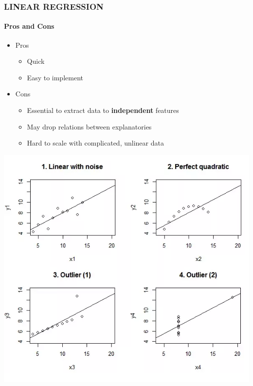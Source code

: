 \documentclass[11pt]{beamer}
\begin{document}
\begin{frame}
	\frametitle{\textbf{LINEAR REGRESSION}}
	\framesubtitle{Pros and Cons}
	\begin{minipage}[c]{0.5\textwidth}
	\begin{itemize}
		\item Pros
		\begin{itemize}
			\pause
			\item Quick
			\pause
			\item Easy to implement	
			\pause
		\end{itemize}
		\item Cons 
			\pause
		\begin{itemize}
			\item Essential to extract data to \textbf{independent} features
			\pause
			\item May drop relations between explanatories
			\pause
			\item Hard to scale with complicated, unlinear data
		\end{itemize}
	\end{itemize}
	\end{minipage}
	\begin{minipage}[c]{0.4\textwidth}
	\begin{center}
		\includegraphics[width=\textwidth]{unLR.png}	
	\end{center}
		\end{minipage}

\end{frame}
\end{document}
